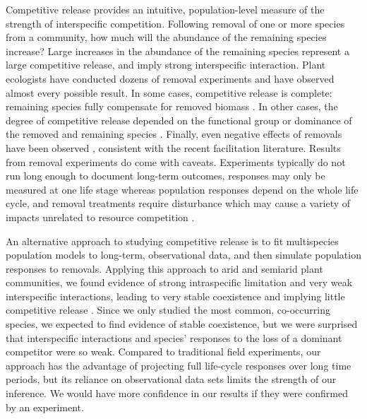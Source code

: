 \documentclass[11pt]{article}
\begin{document}
\begin{doublespacing}
Competitive release provides an intuitive, population-level measure of the strength of interspecific competition. Following removal of one or more species from a community, how much will the abundance of the remaining species increase? Large increases in the abundance of the remaining species represent a large competitive release, and imply strong interspecific interaction. Plant ecologists have conducted dozens of removal experiments and have observed almost every possible result. In some cases, competitive release is complete: remaining species fully compensate for removed biomass \citep{leps_nutrient_1999,jutila_effects_2002}. In other cases, the degree of competitive release depended on the functional group or dominance of the removed and remaining species \citep{smith_dominant_2003,sala_resource_1989,belsky_effects_1992}. Finally, even negative effects of removals have been observed \citep{keddy_effects_1989,gilbert_dominant_2009}, consistent with the recent facilitation literature. Results from removal experiments do come with caveats. Experiments typically do not run long enough to document long-term outcomes, responses may only be measured at one life stage whereas population responses depend on the whole life cycle, and removal treatments require disturbance which may cause a variety of impacts unrelated to resource competition \citep{aarssen_neighbour_1990}.

An alternative approach to studying competitive release is to fit multispecies population models to long-term, observational data, and then simulate population responses to removals. Applying this approach to arid and semiarid plant communities, we found evidence of strong intraspecific limitation and very weak interspecific interactions, leading to very stable coexistence and implying little competitive release \citep{adler_coexistence_2010,chu_large_2015}. Since we only studied the most common, co-occurring species, we expected to find evidence of stable coexistence, but we were surprised that interspecific interactions and species' responses to the loss of a dominant competitor were so weak. Compared to traditional field experiments, our approach has the advantage of projecting full life-cycle responses over long time periods, but its reliance on observational data sets limits the strength of our inference. We would have more confidence in our results if they were confirmed by an experiment.


\end{doublespacing}
\end{document}
